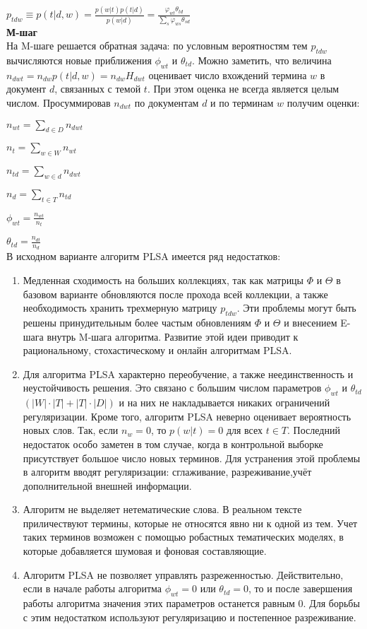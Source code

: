 \documentclass[12pt]{article}
\begin{document}
$p_{tdw} \equiv p(t|d,w) = \frac {p(w|t)p(t|d)} {p(w|d)} = \frac {\varphi_{wt}\theta_{td}} {\sum_s\varphi_{ws}\theta_{sd}}$\\
\textbf{М-шаг}\\
На M-шаге решается обратная задача: по условным вероятностям тем $p_{tdw}$ вычисляются новые приближения $\phi_{wt}$ и $\theta_{td}$.
Можно заметить, что величина $n_{dwt}=n_{dw}p(t|d,w)=n_{dw}H_{dwt}$ оценивает число вхождений термина $w$ в документ $d$, связанных с темой $t$. При этом оценка не всегда является целым числом. Просуммировав $n_{dwt}$ по документам $d$ и по терминам $w$ получим оценки:

$n_{wt}=\sum_{d \in D} n_{dwt}$

$n_t = \sum_{w \in W}n_{wt}$

$n_{td}=\sum_{w \in d} n_{dwt}$

$n_d = \sum_{t \in T}n_{td}$

$\phi_{wt}=\frac{n_{wt}}{n_t}$

$\theta_{td} = \frac{n_{dt}}{n_{d}}$\\
В исходном варианте алгоритм PLSA имеется ряд недостатков:
\begin{enumerate}
\item Медленная сходимость на больших коллекциях, так как матрицы $\Phi$ и $\Theta$ в базовом варианте обновляются после прохода всей коллекции, а также необходимость хранить трехмерную матрицу $p_{tdw}$. Эти проблемы могут быть решены принудительным более частым обновлениям $\Phi$ и $\Theta$ и внесением E-шага внутрь M-шага алгоритма. Развитие этой идеи приводит к рациональному, стохастическому и онлайн алгоритмам PLSA.
\item Для алгоритма PLSA характерно переобучение, а также неединственность и неустойчивость решения. Это связано с большим числом параметров $\phi_{wt}$ и $\theta_{td}$ $(|W|\cdot|T|+|T|\cdot|D|)$ и на них не накладывается никаких ограничений регуляризации. Кроме того, алгоритм PLSA неверно оценивает вероятность новых слов. Так, если $n_w=0$, то $p(w|t)=0$ для всех  $t \in T$. Последний недостаток особо заметен в том случае, когда в контрольной выборке присутствует большое число новых терминов. Для устранения этой проблемы в алгоритм вводят регуляризации: сглаживание, разреживание,учёт дополнительной внешней информации.
\item Алгоритм не выделяет нетематические слова. В реальном тексте приличествуют термины, которые не относятся явно ни к одной из тем. Учет таких терминов возможен с помощью робастных тематических моделях, в которые добавляется шумовая и фоновая составляющие.
\item Алгоритм PLSA не позволяет управлять разреженностью. Действительно, если в начале работы алгоритма $\phi_{wt} = 0$ или $\theta_{td} = 0$, то и после завершения работы алгоритма значения этих параметров останется равным 0. Для борьбы с этим недостатком используют регуляризацию и постепенное разреживание.
\end{enumerate}
\end{document}
